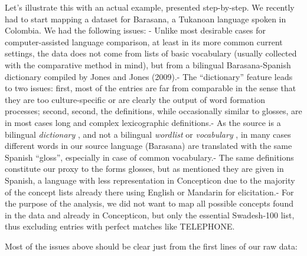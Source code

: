 \documentclass[
  a4paper,
  14pt,
  oneside,
  tablecaptionabove
]{scrbook}
\begin{document}
Let's illustrate this with an actual example, presented step-by-step. We
recently had to start mapping a dataset for Barasana, a Tukanoan
language spoken in Colombia. We had the following issues: - Unlike most
desirable cases for computer-assisted language comparison, at least in
its more common current settings, the data does not come from lists of
basic vocabulary (usually collected with the comparative method in
mind), but from a bilingual Barasana-Spanish dictionary compiled by
Jones and Jones (2009).- The \enquote{dictionary} feature leads to two
issues: first, most of the entries are far from comparable in the sense
that they are too culture-specific or are clearly the output of word
formation processes; second, second, the definitions, while occasionally
similar to glosses, are in most cases long and complex lexicographic
definitions.- As the source is a bilingual \emph{dictionary} , and not a
bilingual \emph{wordlist} or \emph{vocabulary} , in many cases different
words in our source language (Barasana) are translated with the same
Spanish \enquote{gloss}, especially in case of common vocabulary.- The
same definitions constitute our proxy to the forms glosses, but as
mentioned they are given in Spanish, a language with less representation
in Concepticon due to the majority of the concept lists already there
using English or Mandarin for elicitation.- For the purpose of the
analysis, we did not want to map all possible concepts found in the data
and already in Concepticon, but only the essential Swadesh-100 list,
thus excluding entries with perfect matches like TELEPHONE.

Most of the issues above should be clear just from the first lines of
our raw data:
\end{document}
